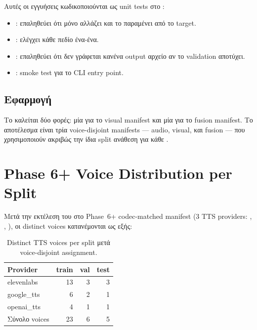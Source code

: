 Αυτές οι εγγυήσεις κωδικοποιούνται ως unit tests
στο :

\begin{english}
\begin{itemize}
  \item {}:
        επαληθεύει ότι μόνο  αλλάζει
        και το  παραμένει από το target.
  \item {}:
        ελέγχει κάθε πεδίο ένα-ένα.
  \item {}:
        επαληθεύει ότι δεν γράφεται κανένα output αρχείο
        αν το validation αποτύχει.
  \item {}:
        smoke test για το CLI entry point.
\end{itemize}
\end{english}

\subsection{Εφαρμογή}
\label{subsec:apply-usage}

Το  καλείται δύο φορές:
μία για το visual manifest και μία για το fusion manifest.
Το αποτέλεσμα είναι τρία voice-disjoint manifests —
audio, visual, και fusion —
που χρησιμοποιούν ακριβώς την ίδια split ανάθεση
για κάθε .

\section{Phase 6+ Voice Distribution per Split}
\label{sec:voice-distribution}

Μετά την εκτέλεση του 
στο Phase~6+ codec-matched manifest
(3 TTS providers: , , ),
οι distinct voices κατανέμονται ως εξής:

\begin{table}[ht]
  \centering
  \begin{tabular}{lrrr}
    \toprule
    Provider & train & val & test \\
    \midrule
    elevenlabs & 13 & 3 & 3 \\
    google\_tts & 6 & 2 & 1 \\
    openai\_tts & 4 & 1 & 1 \\
    \midrule
    Σύνολο voices & 23 & 6 & 5 \\
    \bottomrule
  \end{tabular}
  \caption{Distinct TTS voices per split μετά voice-disjoint
    assignment.}
  \label{tab:voice_split}
\end{table}

